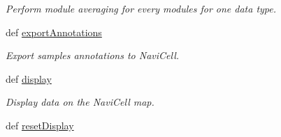 \begin{DoxyCompactItemize}
\begin{DoxyCompactList}\small\item\em Perform module averaging for every modules for one data type. \item\end{DoxyCompactList}\item 
\hypertarget{classnavicom_1_1navicom_1_1NaviCom_a5a59edead26b5d02f17a60df055576f5}{
def \hyperlink{classnavicom_1_1navicom_1_1NaviCom_a5a59edead26b5d02f17a60df055576f5}{exportAnnotations}}
\label{classnavicom_1_1navicom_1_1NaviCom_a5a59edead26b5d02f17a60df055576f5}

\begin{DoxyCompactList}\small\item\em Export samples annotations to NaviCell. \item\end{DoxyCompactList}\item 
def \hyperlink{classnavicom_1_1navicom_1_1NaviCom_ad7d4390d700d4a6d2533647887f8ab94}{display}
\begin{DoxyCompactList}\small\item\em Display data on the NaviCell map. \item\end{DoxyCompactList}\item 
\hypertarget{classnavicom_1_1navicom_1_1NaviCom_a379f15a87ba5c41c3501e9f386102c05}{
def \hyperlink{classnavicom_1_1navicom_1_1NaviCom_a379f15a87ba5c41c3501e9f386102c05}{resetDisplay}}
\label{classnavicom_1_1navicom_1_1NaviCom_a379f15a87ba5c41c3501e9f386102c05}


\end{DoxyCompactItemize}

